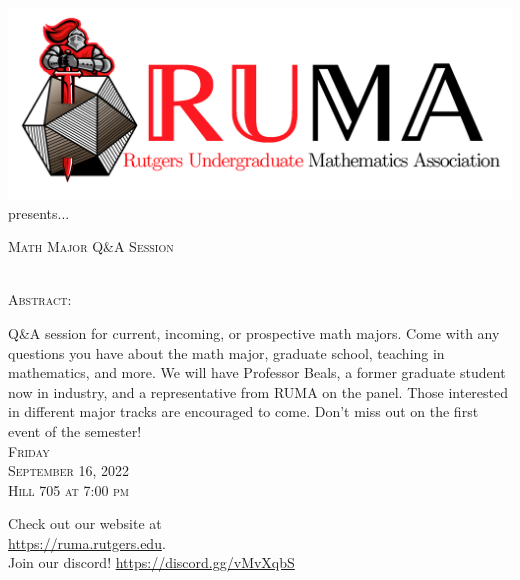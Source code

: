 \documentclass[12pt]{article}
\begin{document}

\begin{center}\includegraphics[scale=.45]{RUMAlogo.png}\\
\large  presents... \\

\vspace{2mm}
\begin{spacing}{1}
{\fontsize{40}{44}\selectfont  \textsc{
Math Major Q\&A Session}} \end{spacing}
 

 ~~\\

\normalsize
\textsc{Abstract:}

\LARGE 
Q\&A session for current, incoming, or prospective math
majors. Come with any questions you have about the math
major, graduate school, teaching in mathematics, and more. We will
have Professor Beals, a former graduate
student now in industry, and a representative from RUMA on the
panel. Those interested in different major tracks are encouraged
to come. Don't miss out on the first event of the semester!\\

\vspace{10mm} 
\Huge   \textsc{Friday\\September 16, 2022 \\Hill 705 at 7:00 pm}
\end{center}
\begin{center}
\Large  Check out our website at \\
\url{https://ruma.rutgers.edu}. \\Join our 
discord! \url{https://discord.gg/vMvXqbS}
\end{center}
\end{document}
